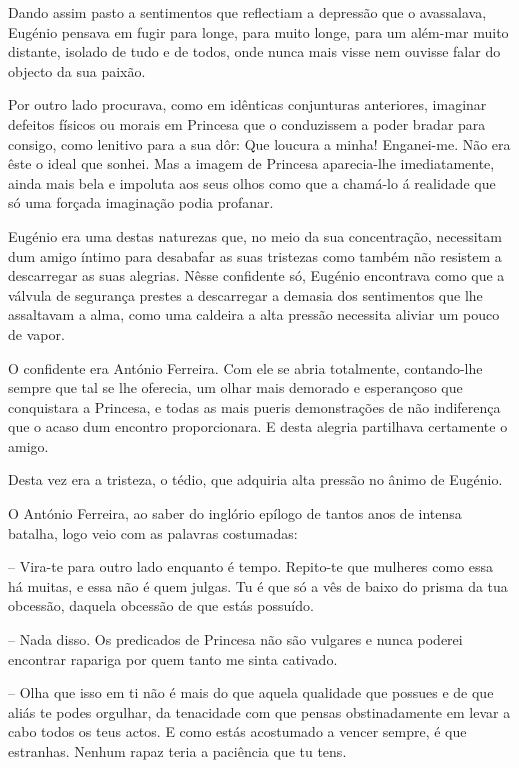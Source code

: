 \documentclass[9pt]{article}
\begin{document}
Dando assim pasto a sentimentos que reflectiam a depressão que o
avassalava, Eugé\-nio pensava em fugir para longe, para muito longe, para
um além-mar muito distante, isolado de tudo e de todos, onde nunca mais visse nem ouvisse falar do objecto da sua paixão.

Por outro lado procurava, como em idênticas conjunturas anteriores,
imaginar defeitos físicos ou morais em Princesa que o conduzissem a poder bradar para consigo, como lenitivo para a sua dôr: Que loucura a minha! Enganei-me. Não era êste o ideal que sonhei. Mas a imagem de Princesa aparecia-\-lhe imediatamente, ainda mais bela e impoluta aos seus o\-lhos
como que a chamá-lo á realidade que só uma forçada imagina\-ção podia profanar.

Eugé\-nio era uma destas naturezas que, no meio da sua concentra\-ção,
necessitam dum amigo íntimo para desabafar as suas tristezas como também
não resistem a descarregar as suas alegrias. Nêsse confidente só, Eugé\-nio
encontrava como que a válvula de seguran\-ça prestes a descarregar a demasia
dos sentimentos que lhe assaltavam a alma, como uma caldeira a alta
pressão necessita aliviar um pouco de vapor.

O confidente era António Ferreira. Com ele se abria totalmente, contando-\-lhe sempre que tal se lhe oferecia, um o\-lhar mais demorado e esperançoso que conquistara a Princesa, e todas as mais pueris demonstra\-ções
de não indiferença que o acaso dum encontro proporcionara. E desta alegria
parti\-lhava certamente o amigo.

Desta vez era a tristeza, o tédio, que adquiria alta pressão no ânimo de Eugé\-nio.

O António Ferreira, ao saber do inglório epílogo de tantos anos de
intensa bata\-lha, logo veio com as palavras costumadas:

-- Vira-te para outro lado enquanto é tempo. Repito-te que mu\-lheres
como essa há muitas, e essa não é quem julgas. Tu é que só a vês de baixo
do prisma da tua obcessão, daquela obcessão de que estás possuído.

-- Nada disso. Os predicados de Princesa não são vulgares e nunca
poderei encontrar rapariga por quem tanto me sinta cativado.

-- O\-lha que isso em ti não é mais do que aquela qualidade que possues
e de que aliás te podes orgu\-lhar, da tenacidade com que pensas obstinadamente em levar a cabo todos os teus actos. E como estás acostumado a vencer sempre, é que estranhas. Nenhum rapaz teria a paciência que tu tens.
\end{document}
